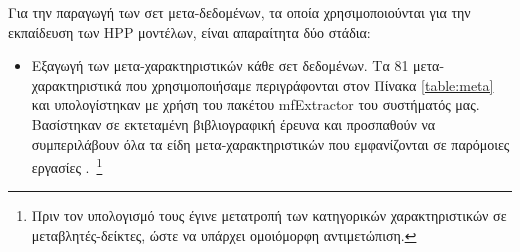Για την παραγωγή των σετ μετα-δεδομένων, τα οποία χρησιμοποιούνται για την εκπαίδευση των HPP μοντέλων, είναι απαραίτητα δύο στάδια:
\begin{itemize}
	\item Εξαγωγή των μετα-χαρακτηριστικών κάθε σετ δεδομένων. Τα  81 μετα-χαρακτηριστικά που χρησιμοποιήσαμε περιγράφονται στον Πίνακα \ref{table:meta} και υπολογίστηκαν με χρήση του πακέτου mf\-Extractor του συστήματός μας. Βασίστηκαν σε εκτεταμένη βιβλιογραφική έρευνα και προσπαθούν να συμπεριλάβουν όλα τα είδη μετα-χαρακτηριστικών που εμφανίζονται σε παρόμοιες εργασίες \citep{Brazdil2009,Reif_meta2-features:,Feurer:2014:UMI:3015544.3015549}.~\footnote{Πριν τον υπολογισμό τους έγινε μετατροπή των κατηγορικών χαρακτηριστικών σε μεταβλητές-δείκτες, ώστε να υπάρχει ομοιόμορφη αντιμετώπιση.}   
		\begin{table}[!htb]
			\begin{center}
				\caption{Λίστα μετα-χαρακτηριστικών, τα οποία χρησιμοποιήθηκαν για την εκπαίδευση των HPP μοντέλων}
				\label{table:meta}
\end{center}
\end{table}
\end{itemize}
